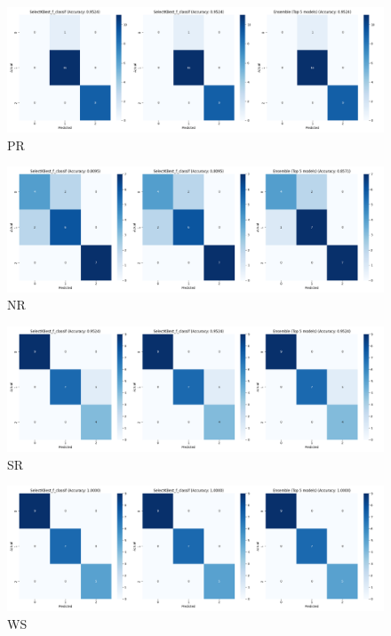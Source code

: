 \begin{figure}
    \centering
    \includegraphics[width=0.75\linewidth]{class_all_section/images_class_ensemble_reduction/confusion_matrices_PR.png}
    \caption{PR}
    \label{fig:pr_class_ensemble_reduction}
\end{figure}

\begin{figure}
    \centering
    \includegraphics[width=0.75\linewidth]{class_all_section/images_class_ensemble_reduction/confusion_matrices_NR.png}
    \caption{NR}
    \label{fig:nr_class_ensemble_reduction}
\end{figure}

\begin{figure}
    \centering
    \includegraphics[width=0.75\linewidth]{class_all_section/images_class_ensemble_reduction/confusion_matrices_SR.png}
    \caption{SR}
    \label{fig:sr_class_ensemble_reduction}
\end{figure}

\begin{figure}
    \centering
    \includegraphics[width=0.75\linewidth]{class_all_section/images_class_ensemble_reduction/confusion_matrices_WS.png}
    \caption{WS}
    \label{fig:ws_class_ensemble_reduction}
\end{figure}

